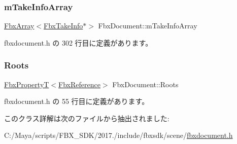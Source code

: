 \subsubsection{\texorpdfstring{m\+Take\+Info\+Array}{mTakeInfoArray}}
{\footnotesize\ttfamily \hyperlink{class_fbx_array}{Fbx\+Array}$<$\hyperlink{class_fbx_take_info}{Fbx\+Take\+Info}$\ast$$>$ Fbx\+Document\+::m\+Take\+Info\+Array\hspace{0.3cm}{\ttfamily [protected]}}



 fbxdocument.\+h の 302 行目に定義があります。

\mbox{\label{class_fbx_document_a268f701bbd245e43e661bc9a69f87646}} 
\subsubsection{\texorpdfstring{Roots}{Roots}}
{\footnotesize\ttfamily \hyperlink{class_fbx_property_t}{Fbx\+PropertyT}$<$\hyperlink{fbxtypes_8h_a44df6a2eec915cf27cd481e5c5e48a24}{Fbx\+Reference}$>$ Fbx\+Document\+::\+Roots}



 fbxdocument.\+h の 55 行目に定義があります。



このクラス詳解は次のファイルから抽出されました\+:\begin{DoxyCompactItemize}
\item 
C\+:/\+Maya/scripts/\+F\+B\+X\+\_\+\+S\+D\+K/2017./include/fbxsdk/scene/\hyperlink{fbxdocument_8h}{fbxdocument.\+h}\end{DoxyCompactItemize}
